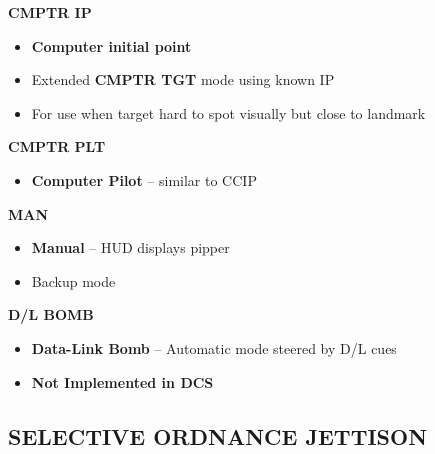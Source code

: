 \documentclass[fontSpartan]{TechCheck}
\begin{document}
\begin{tableitemize}
{\begin{subitemize}
\begin{itemize}
			\end{itemize}
			\item \textbf{CMPTR IP}
			\begin{itemize}
				\item \textbf{Computer initial point}
				\item Extended \textbf{CMPTR TGT} mode using known IP
				\item For use when target hard to spot visually but close to landmark
			\end{itemize}
			\item \textbf{CMPTR PLT}
			\begin{itemize}
				\item \textbf{Computer Pilot} -- similar to CCIP
			\end{itemize}
			\item \textbf{MAN}
			\begin{itemize}
				\item \textbf{Manual} -- HUD displays pipper
				\item Backup mode
			\end{itemize}
			\item \textbf{D/L BOMB}
			\begin{itemize}
				\item \textbf{Data-Link Bomb} -- Automatic mode steered by D/L cues
				\item \textbf{Not Implemented in DCS}
			\end{itemize}
		\end{subitemize}}
	\end{tableitemize}


	\subsection{SELECTIVE ORDNANCE JETTISON}
	\begin{tablenumerate}
	\end{tablenumerate}
\end{document}
